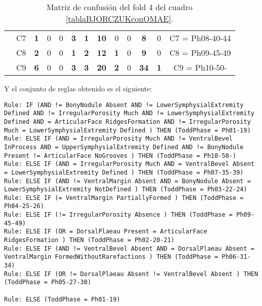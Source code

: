 \begin{table}[H]
{\begin{tabular}{|ccccccccccccc|}
\multicolumn{1}{|c|}{}                                      & \multicolumn{1}{c|}{C7} & \multicolumn{1}{c|}{\textbf{1}} & \multicolumn{1}{c|}{0}          & \multicolumn{1}{c|}{0}          & \multicolumn{1}{c|}{\textbf{3}} & \multicolumn{1}{c|}{\textbf{1}} & \multicolumn{1}{c|}{\textbf{10}} & \multicolumn{1}{c|}{0}          & \multicolumn{1}{c|}{0}  & \multicolumn{1}{c|}{\textbf{8}}  & \multicolumn{1}{c|}{0}          & C7 = Ph08-40-44   \\ \cline{2-13}
\multicolumn{1}{|c|}{}                                      & \multicolumn{1}{c|}{C8} & \multicolumn{1}{c|}{\textbf{2}} & \multicolumn{1}{c|}{0}          & \multicolumn{1}{c|}{0}          & \multicolumn{1}{c|}{\textbf{1}} & \multicolumn{1}{c|}{\textbf{2}} & \multicolumn{1}{c|}{\textbf{12}} & \multicolumn{1}{c|}{\textbf{1}} & \multicolumn{1}{c|}{0}  & \multicolumn{1}{c|}{\textbf{9}}  & \multicolumn{1}{c|}{0}          & C8 = Ph09-45-49   \\ \cline{2-13}
\multicolumn{1}{|c|}{}                                      & \multicolumn{1}{c|}{C9} & \multicolumn{1}{c|}{\textbf{6}} & \multicolumn{1}{c|}{0}          & \multicolumn{1}{c|}{0}          & \multicolumn{1}{c|}{\textbf{3}} & \multicolumn{1}{c|}{\textbf{3}} & \multicolumn{1}{c|}{\textbf{20}} & \multicolumn{1}{c|}{\textbf{2}} & \multicolumn{1}{c|}{0}  & \multicolumn{1}{c|}{\textbf{34}} & \multicolumn{1}{c|}{\textbf{1}} & C9 = Ph10-50-     \\ \hline
\end{tabular}%
}
\caption{Matriz de confusión del fold 4 del cuadro \ref{tablaBJORCZUKconOMAE}.}
\end{table}

\newpage

Y el conjunto de reglas obtenido es el siguiente:

\begin{lstlisting}
Rule: IF (AND != BonyNodule Absent AND != LowerSymphysialExtremity Defined AND != IrregularPorosity Much AND != LowerSymphysialExtremity Defined AND = ArticularFace RidgesFormation AND != IrregularPorosity Much = LowerSymphysialExtremity Defined ) THEN (ToddPhase = Ph01-19)
Rule: ELSE IF (AND = IrregularPorosity Much AND != VentralBevel InProcess AND = UpperSymphysialExtremity Defined AND != BonyNodule Present != ArticularFace NoGrooves ) THEN (ToddPhase = Ph10-50-)
Rule: ELSE IF (AND = IrregularPorosity Much AND = VentralBevel Absent = LowerSymphysialExtremity Defined ) THEN (ToddPhase = Ph07-35-39)
Rule: ELSE IF (AND != VentralMargin Absent AND = BonyNodule Absent = LowerSymphysialExtremity NotDefined ) THEN (ToddPhase = Ph03-22-24)
Rule: ELSE IF (= VentralMargin PartiallyFormed ) THEN (ToddPhase = Ph04-25-26)
Rule: ELSE IF (!= IrregularPorosity Absence ) THEN (ToddPhase = Ph09-45-49)
Rule: ELSE IF (OR = DorsalPlaeau Present = ArticularFace RidgesFormation ) THEN (ToddPhase = Ph02-20-21)
Rule: ELSE IF (AND != VentralBevel Absent AND = DorsalPlaeau Absent = VentralMargin FormedWithoutRarefactions ) THEN (ToddPhase = Ph06-31-34)
Rule: ELSE IF (OR != DorsalPlaeau Absent != VentralBevel Absent ) THEN (ToddPhase = Ph05-27-30)

Rule: ELSE (ToddPhase = Ph01-19)
\end{lstlisting}

